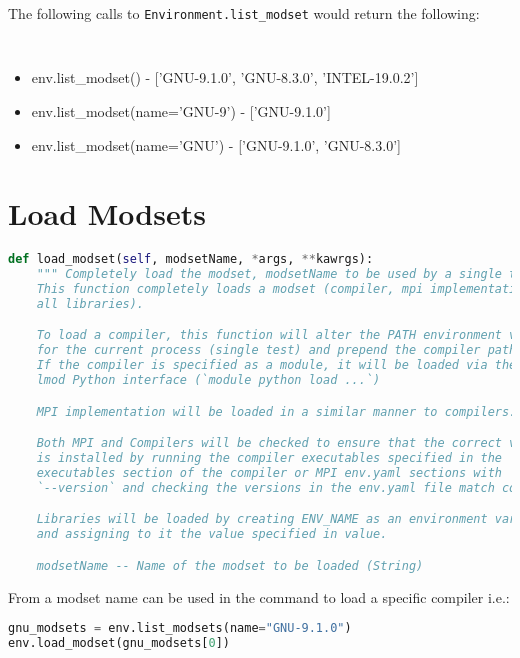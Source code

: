 The following calls to {\tt Environment.list\_modset} would return the
following:

{\tt
\begin{itemize}
\item env.list\_modset() - ['GNU-9.1.0', 'GNU-8.3.0', 'INTEL-19.0.2']
\item env.list\_modset(name='GNU-9') - ['GNU-9.1.0']
\item env.list\_modset(name='GNU') - ['GNU-9.1.0', 'GNU-8.3.0']
\end{itemize}
}


\section{Load Modsets}
\label{sec:load-modsets}

\begin{lstlisting}[language=Python, 
                   caption={load\_modset Definition},
                   label=load_modset_def]
def load_modset(self, modsetName, *args, **kawrgs):
    """ Completely load the modset, modsetName to be used by a single test.
    This function completely loads a modset (compiler, mpi implementation, and
    all libraries).

    To load a compiler, this function will alter the PATH environment variable
    for the current process (single test) and prepend the compiler path to it.
    If the compiler is specified as a module, it will be loaded via the
    lmod Python interface (`module python load ...`)

    MPI implementation will be loaded in a similar manner to compilers.

    Both MPI and Compilers will be checked to ensure that the correct version
    is installed by running the compiler executables specified in the
    executables section of the compiler or MPI env.yaml sections with
    `--version` and checking the versions in the env.yaml file match correctly.

    Libraries will be loaded by creating ENV_NAME as an environment variable
    and assigning to it the value specified in value.

    modsetName -- Name of the modset to be loaded (String)
\end{lstlisting}

From a modset name can be used in the \loadModset command to load a specific
compiler i.e.:

\begin{lstlisting}[language=Python]
gnu_modsets = env.list_modsets(name="GNU-9.1.0")
env.load_modset(gnu_modsets[0])
\end{lstlisting}

